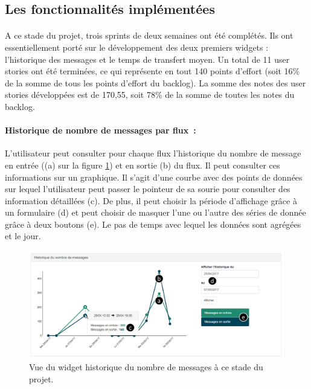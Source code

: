 		\subsection{Les fonctionnalités implémentées}
			\paragraph{}%
			A ce stade du projet, trois sprints de deux semaines ont été complétés. Ils
			ont essentiellement porté sur le développement des deux premiers widgets :
			l'historique des messages et le temps de transfert moyen. Un total de 11 user
			stories ont été terminées, ce qui représente en tout 140 points d'effort
			(soit 16\% de la somme de tous les points d'effort du backlog). La somme des
			notes des user stories développées est de 170,55, soit 78\% de la somme de toutes
			les notes du backlog.
		
			\paragraph{Historique de nombre de messages par flux~: }
			L'utilisateur peut consulter pour chaque flux l'historique du nombre de
			message en entrée ((a) sur la figure \ref{vue_history}) et en sortie (b) du
			flux. Il peut consulter ces informations sur un graphique. Il s'agit d'une courbe avec des points de données sur
			lequel l'utilisateur peut passer le pointeur de sa sourie pour consulter des
			information détaillées (c). De plus, il peut choisir la période d'affichage
			grâce à un formulaire (d) et peut choisir de masquer l'une ou l'autre des
			séries de donnée grâce à deux boutons (e). Le pas de temps avec lequel les
			données sont agrégées et le jour.
			\begin{figure}[H]
				\centering
				\includegraphics[width=12cm]{../img/part3/vue_history.png}
				\caption{\label{vue_history} Vue du widget historique du nombre de messages
				à ce stade du projet.}
			\end{figure}
			
